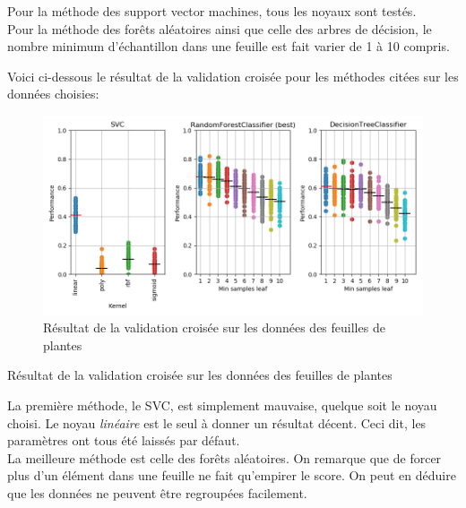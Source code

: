 \documentclass[11pt, a4paper]{article}
\begin{document}
Pour la méthode des support vector machines, tous les noyaux sont testés. \\
Pour la méthode des forêts aléatoires ainsi que celle des arbres de décision,
le nombre minimum d'échantillon dans une feuille est fait varier de 1 à 10 compris. \\

\newpage

Voici ci-dessous le résultat de la validation croisée pour les méthodes citées sur les données choisies:

\begin{figure}[H]
    \begin{center}
        \includegraphics[width=1\textwidth]{ex3}
    \end{center}
    \caption{Résultat de la validation croisée sur les données des feuilles de plantes}
    \label{Résultat de la validation croisée sur les données des feuilles de plantes}
\end{figure}

\begin{table}[H]
    \begin{center}
    \end{center}
    \caption{Résultat de la validation croisée sur les données des feuilles de plantes}
    \label{Résultat de la validation croisée sur les données des feuilles de plantes}
\end{table}

La première méthode, le SVC, est simplement mauvaise, quelque soit le noyau choisi.
Le noyau \textit{linéaire} est le seul à donner un résultat décent.
Ceci dit, les paramètres ont tous été laissés par défaut. \\

La meilleure méthode est celle des forêts aléatoires.
On remarque que de forcer plus d'un élément dans une feuille ne fait qu'empirer le score.
On peut en déduire que les données ne peuvent être regroupées facilement. \\
\end{document}
